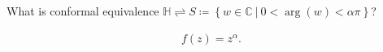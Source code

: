 \begin{problem}[?]

What is conformal equivalence
\({\mathbb{H}}\rightleftharpoons S \coloneqq\left\{{w\in {\mathbb{C}}{~\mathrel{\Big|}~}0 < \arg(w) < \alpha \pi}\right\}\)?

\begin{solution}

\begin{align*}
f(z) = z^ \alpha
.\end{align*}

\end{solution}

\end{problem}


\printbibliography[title=Bibliography]



